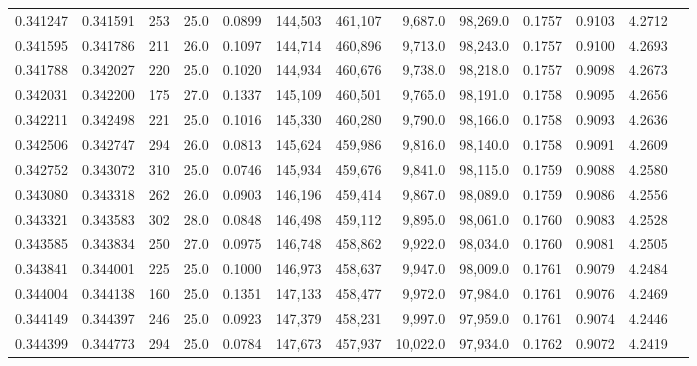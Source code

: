 \begin{tabular}{rrrrrrrrrrrrr}
0.341247 & 0.341591 &   253 & 25.0 &                                     0.0899 & 144,503 & 461,107 &   9,687.0 &  98,269.0 & 0.1757 & 0.9103 & 4.2712 \\
0.341595 & 0.341786 &   211 & 26.0 &                                     0.1097 & 144,714 & 460,896 &   9,713.0 &  98,243.0 & 0.1757 & 0.9100 & 4.2693 \\
0.341788 & 0.342027 &   220 & 25.0 &                                     0.1020 & 144,934 & 460,676 &   9,738.0 &  98,218.0 & 0.1757 & 0.9098 & 4.2673 \\
0.342031 & 0.342200 &   175 & 27.0 &                                     0.1337 & 145,109 & 460,501 &   9,765.0 &  98,191.0 & 0.1758 & 0.9095 & 4.2656 \\
0.342211 & 0.342498 &   221 & 25.0 &                                     0.1016 & 145,330 & 460,280 &   9,790.0 &  98,166.0 & 0.1758 & 0.9093 & 4.2636 \\
0.342506 & 0.342747 &   294 & 26.0 &                                     0.0813 & 145,624 & 459,986 &   9,816.0 &  98,140.0 & 0.1758 & 0.9091 & 4.2609 \\
0.342752 & 0.343072 &   310 & 25.0 &                                     0.0746 & 145,934 & 459,676 &   9,841.0 &  98,115.0 & 0.1759 & 0.9088 & 4.2580 \\
0.343080 & 0.343318 &   262 & 26.0 &                                     0.0903 & 146,196 & 459,414 &   9,867.0 &  98,089.0 & 0.1759 & 0.9086 & 4.2556 \\
0.343321 & 0.343583 &   302 & 28.0 &                                     0.0848 & 146,498 & 459,112 &   9,895.0 &  98,061.0 & 0.1760 & 0.9083 & 4.2528 \\
0.343585 & 0.343834 &   250 & 27.0 &                                     0.0975 & 146,748 & 458,862 &   9,922.0 &  98,034.0 & 0.1760 & 0.9081 & 4.2505 \\
0.343841 & 0.344001 &   225 & 25.0 &                                     0.1000 & 146,973 & 458,637 &   9,947.0 &  98,009.0 & 0.1761 & 0.9079 & 4.2484 \\
0.344004 & 0.344138 &   160 & 25.0 &                                     0.1351 & 147,133 & 458,477 &   9,972.0 &  97,984.0 & 0.1761 & 0.9076 & 4.2469 \\
0.344149 & 0.344397 &   246 & 25.0 &                                     0.0923 & 147,379 & 458,231 &   9,997.0 &  97,959.0 & 0.1761 & 0.9074 & 4.2446 \\
0.344399 & 0.344773 &   294 & 25.0 &                                     0.0784 & 147,673 & 457,937 &  10,022.0 &  97,934.0 & 0.1762 & 0.9072 & 4.2419 \\

\end{tabular}
